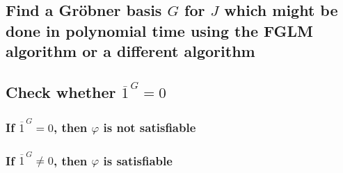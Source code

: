 \documentclass[11pt]{article}
\begin{document}
\newpage
\subsection{Find a Gr\"obner basis $G$ for $J$ which might be done in polynomial time using the FGLM algorithm or a different algorithm}

\subsection{Check whether $\overline{1}^{\,G}=0$}

\subsubsection{If $\overline{1}^{\,G}=0$, then $\varphi$ is not satisfiable}

\subsubsection{If $\overline{1}^{\,G}\neq 0$, then $\varphi$ is satisfiable}
\end{document}
